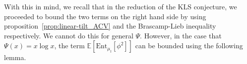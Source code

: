 
With this in mind, we recall that in the reduction of the KLS conjecture, we proceeded to bound the two terms on the 
right hand side by using proposition~\ref{prop:linear-tilt_ACV} and the Brascamp-Lieb inequality respectively. 
We cannot do this for general \(\Psi\). However, in the case that \(\Psi(x) = x\log x\), 
the term \(\mathbb{E}[\text{Ent}_{\mu_t}[\phi^2]]\) can be bounded using the following lemma.

